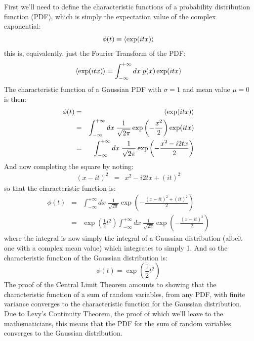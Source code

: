 \documentclass[12pt]{article}
\begin{document}
First we'll need to define the characteristic functions of a probability distribution function (PDF), which is simply the expectation value of the complex exponential:
\begin{equation*}   
\phi(t) \equiv \braket{\exp(itx)}  
\end{equation*}  
this is, equivalently, just the Fourier Transform of the PDF:
\begin{equation*}
\braket{\exp(itx)} = \int_{-\infty}^{+\infty} dx \; p(x) \exp(itx)
\end{equation*}
The characteristic function of a Gaussian PDF with $\sigma=1$ and mean value $\mu=0$ is then:
\begin{eqnarray*}
\phi(t) &=& \braket{\exp(itx)}\\
&=& \int_{-\infty}^{+\infty} dx \; \frac{1}{\sqrt{2\pi}} \exp\left(-\frac{x^2}{2}\right)\exp(itx)\\
&=& \int_{-\infty}^{+\infty} dx \; \frac{1}{\sqrt{2\pi}} \exp\left(-\frac{x^2-i2tx}{2}\right)
\end{eqnarray*}
And now completing the square by noting:
\begin{eqnarray*}
(x-it)^2 &=& x^2 - i2tx + (it)^2 
\end{eqnarray*}
so that the characteristic function is:
\begin{eqnarray*}
\phi(t) &=& \int_{-\infty}^{+\infty} dx \; \frac{1}{\sqrt{2\pi}} \exp\left(-\frac{(x-it)^2+(it)^2}{2}\right)\\
&=& \exp\left(\frac{1}{2}t^2\right)\int_{-\infty}^{+\infty} dx \; \frac{1}{\sqrt{2\pi}} \exp\left(-\frac{(x-it)^2}{2}\right)
\end{eqnarray*}   
where the integral is now simply the integral of a Gaussian distribution (albeit one with a complex mean value) which integrates to simply 1.  And so the characteristic function of the Gaussian distribution is:
\begin{equation}
\phi(t) = \exp\left(\frac{1}{2}t^2\right) \label{eqn:cfn}
\end{equation}
 The proof of the Central Limit Theorem amounts to showing that the characteristic function of a sum of random variables, from any PDF, with finite variance converges to the characteristic function for the Gaussian distribution.  Due to Levy's Continuity Theorem, the proof of which we'll leave to the mathematicians, this means that the PDF for the sum of random variables converges to the Gaussian distribution.
\end{document}
